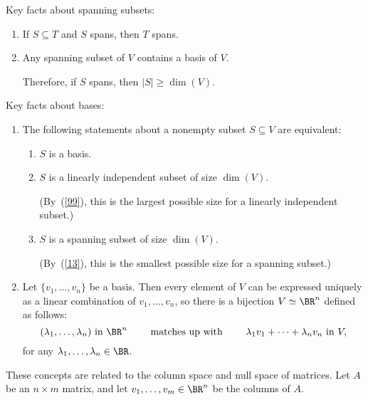 \documentclass[10pt]{amsart}
\theoremstyle{mythm}
\theoremstyle{definition}
\theoremstyle{myrmk}
\newcounter{part-count}
\newenvironment{me}{\begin{enumerate}\setcounter{enumi}{\value{part-count}}}{\setcounter{part-count}{\value{enumi}}\end{enumerate}}
\begin{document}
	Key facts about spanning subsets: 
	\begin{me}
		\item If $S \subseteq T$ and $S$ spans, then $T$ spans. 
		\item Any spanning subset of $V$ contains a basis of $V$. 
		 \label{13} 
		 
		 Therefore, if $S$ spans, then $|S| \ge \dim (V)$. 
	\end{me}
	Key facts about bases: 
	\begin{me}
		\item The following statements about a nonempty subset $S \subseteq V$ are equivalent:  
		\begin{enumerate}[label=(\alph*)]
			\item $S$ is a basis. 
			\item $S$ is a linearly independent subset of size $\dim (V)$. 
			
			(By~(\ref{99}), this is the largest possible size for a linearly independent subset.) 
			\item $S$ is a spanning subset of size $\dim(V)$. 
			
			(By~(\ref{13}), this is the smallest possible size for a spanning subset.) 
		\end{enumerate} 
		\item Let $\{v_1, \ldots, v_n\}$ be a basis. Then every element of $V$ can be expressed uniquely as a linear combination of $v_1, \ldots, v_n$, so there is a bijection $V \simeq \BR^n$ defined as follows: 
		\[
		(\lambda_1, \ldots, \lambda_n) \text{ in } \BR^n \qquad \text{ matches up with } \qquad \lambda_1v_1 + \cdots + \lambda_n v_n \text{ in } V,
		\]
		for any $\lambda_1, \ldots, \lambda_n \in \BR$. 
	\end{me}
	These concepts are related to the column space and null space of matrices. Let $A$ be an $n \times m$ matrix, and let $v_1, \ldots, v_m \in \BR^n$ be the columns of $A$. 
\end{document}
